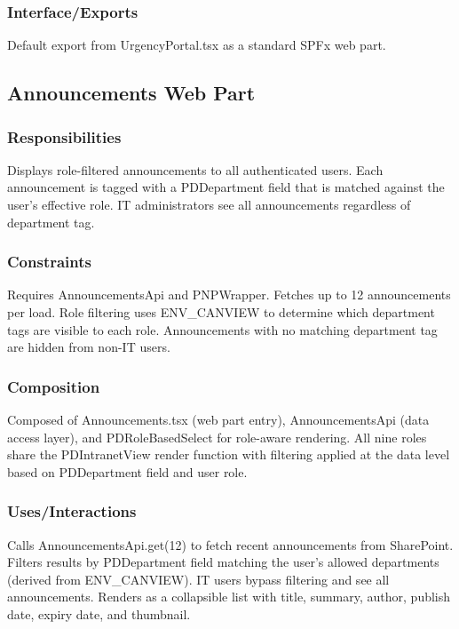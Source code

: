 \documentclass[12pt]{article}
\begin{document}
\subsubsection{Interface/Exports}

Default export from UrgencyPortal.tsx as a standard SPFx web part.

\subsection{Announcements Web Part}

\subsubsection{Responsibilities}

Displays role-filtered announcements to all authenticated users. Each announcement is tagged with a PDDepartment field that is matched against the user's effective role. IT administrators see all announcements regardless of department tag.

\subsubsection{Constraints}

Requires AnnouncementsApi and PNPWrapper. Fetches up to 12 announcements per load. Role filtering uses ENV\_CANVIEW to determine which department tags are visible to each role. Announcements with no matching department tag are hidden from non-IT users.

\subsubsection{Composition}

Composed of Announcements.tsx (web part entry), AnnouncementsApi (data access layer), and PDRoleBasedSelect for role-aware rendering. All nine roles share the PDIntranetView render function with filtering applied at the data level based on PDDepartment field and user role.

\subsubsection{Uses/Interactions}

Calls AnnouncementsApi.get(12) to fetch recent announcements from SharePoint. Filters results by PDDepartment field matching the user's allowed departments (derived from ENV\_CANVIEW). IT users bypass filtering and see all announcements. Renders as a collapsible list with title, summary, author, publish date, expiry date, and thumbnail.
\end{document}

